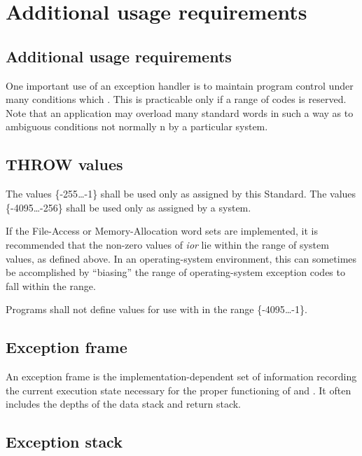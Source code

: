 \section{Additional usage requirements} %

\begin{intro}
\subsection{Additional usage requirements}

One important use of an exception handler is to maintain program
control under many conditions which . This is practicable
only if a range of codes is reserved. Note that an application may
overload many standard words in such a way as to 
ambiguous conditions not normally n by a particular
system.
\end{intro}

\subsection{THROW values} %
\label{exception:throw}

The  values \{-255{\ldots}-1\} shall be used only as
assigned by this Standard. The values \{-4095{\ldots}-256\}
shall be used only as assigned by a system.

If the File-Access or Memory-Allocation word sets are implemented,
it is recommended that the non-zero values of \emph{ior} lie within
the range of system  values, as defined above. In an
operating-system environment, this can sometimes be accomplished
by ``biasing'' the range of operating-system exception codes to fall
within the  range.

Programs shall not define values for use with  in the
range \{-4095{\ldots}-1\}.

\subsection{Exception frame} %

An exception frame is the implementation-dependent set of
information recording the current execution state necessary for
the proper functioning of  and . It often
includes the depths of the data stack and return stack.

\subsection{Exception stack} %

